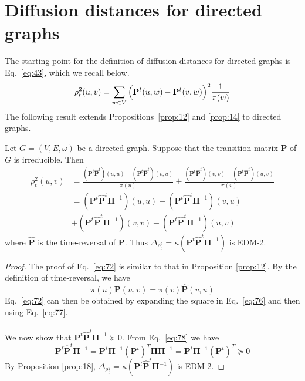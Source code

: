 \section{Diffusion distances for directed graphs}
\label{sec:diff-dist-direct}
The starting point for the definition of diffusion distances for
directed graphs is Eq.~\eqref{eq:43}, which we recall below.
\begin{equation}
  \label{eq:76}
  \rho^{2}_{t}(u,v) = \sum_{w \in V}{\Bigl(\mathbf{P}^{t}(u,w) -
      \mathbf{P}^{t}(v,w)\Bigr)^2 \frac{1}{\pi(w)}}
\end{equation}
The following result extends Propositions~\ref{prop:12} and
\ref{prop:14} to directed
graphs.
\begin{proposition}
  \label{prop:20}
  Let $G = (V,E,\omega)$ be a directed graph. Suppose that
  the transition matrix $\mathbf{P}$ of $G$ is irreducible. Then
  \begin{equation}
    \label{eq:72}
     \begin{split}
      \rho_{t}^{2}(u,v) &= \frac{(\mathbf{P}^{t}\hat{\mathbf{P}}^{t})(u,u) -
        (\mathbf{P}^{t}\hat{\mathbf{P}}^{t})(v,u)}{\pi(u)} +
      \frac{(\mathbf{P}^{t}\hat{\mathbf{P}}^{t})(v,v) -
        (\mathbf{P}^{t}\hat{\mathbf{P}}^{t})(u,v)}{\pi(v)}  \\
      &= (\mathbf{P}^{t}\hat{\mathbf{P}}^{t}\bm{\Pi}^{-1})(u,u) -
      (\mathbf{P}^{t}\hat{\mathbf{P}}^{t}\bm{\Pi}^{-1})(v,u) \\
      &+ (\mathbf{P}^{t}\hat{\mathbf{P}}^{t}\bm{\Pi}^{-1})(v,v) -
      (\mathbf{P}^{t}\hat{\mathbf{P}}^{t}\bm{\Pi}^{-1})(u,v)
    \end{split}
  \end{equation}
  where $\hat{\mathbf{P}}$ is the time-reversal of $\mathbf{P}$.  Thus
  $\Delta_{\rho_{t}^{2}} =
  \kappa(\mathbf{P}^{t}\hat{\mathbf{P}}^{t}\bm{\Pi}^{-1})$ is EDM-2.
\end{proposition}
\begin{proof}
  The proof of Eq.~\eqref{eq:72} is similar to that in Proposition
  \ref{prop:12}. By the definition of time-reversal, we have
  \begin{equation}
    \label{eq:77}
    \pi(u) \mathbf{P}(u,v) = \pi(v) \hat{\mathbf{P}}(v,u)
  \end{equation}
  Eq.~\eqref{eq:72} can then be obtained by expanding the square in
  Eq.~\eqref{eq:76} and then using Eq.~\eqref{eq:77}. \\ \\
  \noindent We now show that
  $\mathbf{P}^{t}\hat{\mathbf{P}}^{t}\bm{\Pi}^{-1} \succeq 0$. From
  Eq.~\eqref{eq:78} we have
  \begin{equation}
    \label{eq:79}
      \mathbf{P}^{t}\hat{\mathbf{P}}^{t}\bm{\Pi}^{-1} = 
      \mathbf{P}^{t}\bm{\Pi}^{-1}(\mathbf{P}^{t})^{T}\bm{\Pi}\bm{\Pi}^{-1}
      = \mathbf{P}^{t}\bm{\Pi}^{-1}(\mathbf{P}^{t})^{T} \succeq 0
  \end{equation}
  By Proposition \ref{prop:18}, $\Delta_{\rho_{t}^2} =
  \kappa(\mathbf{P}^{t}\hat{\mathbf{P}}^{t}\bm{\Pi}^{-1})$ is EDM-2.
\end{proof}
